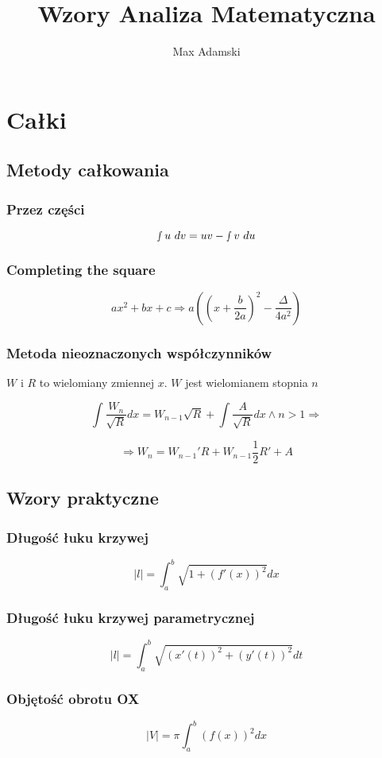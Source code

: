 \documentclass[11pt]{article}
\title{Wzory Analiza Matematyczna}
\author{Max Adamski}
\date{}
\begin{document}
\section{Całki}

\subsection{Metody całkowania}

\subsubsection{Przez części}
$$\smallint u\ dv = uv - \smallint v\ du$$

\subsubsection{Completing the square}
$$
ax^2 + bx + c \Rightarrow
a\left(\left(x + \frac{b}{2a}\right)^2 - \frac{\Delta}{4a^2}\right)
$$

\subsubsection{Metoda nieoznaczonych współczynników}

$W$ i $R$ to wielomiany zmiennej $x$. $W$ jest wielomianem stopnia $n$

$$\int \frac{W_n}{\sqrt R} dx = W_{n-1} \sqrt R + \int \frac{A}{\sqrt R} dx \land n > 1 \Rightarrow$$

$$\Rightarrow W_n = W_{n-1}' R + W_{n-1} \frac{1}{2} R' + A$$


\subsection{Wzory praktyczne}

\subsubsection{Długość łuku krzywej}
$$|l| = \int_a^b \sqrt{1 + (f'(x))^2}dx$$

\subsubsection{Długość łuku krzywej parametrycznej}
$$|l| = \int_a^b \sqrt{(x'(t))^2 + (y'(t))^2}dt$$

\subsubsection{Objętość obrotu OX}
$$|V| = \pi \int_a^b (f(x))^2 dx$$
\end{document}

